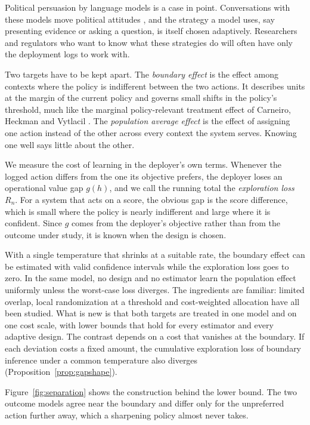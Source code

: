 \documentclass[12pt]{article}
\theoremstyle{definition}
\theoremstyle{remark}
\begin{document}
Political persuasion by language models is a case in point. Conversations with these
models move political attitudes \cite{salvi2025conversational,hackenburg2025levers},
and the strategy a model uses, say presenting evidence or asking a question, is
itself chosen adaptively. Researchers and regulators who want to know what these
strategies do will often have only the deployment logs to work with.

Two targets have to be kept apart. The \emph{boundary effect} is the effect among
contexts where the policy is indifferent between the two actions. It describes units
at the margin of the current policy and governs small shifts in the policy's
threshold, much like the marginal policy-relevant treatment effect of Carneiro,
Heckman and Vytlacil \cite{carneiro2010evaluating}. The \emph{population average
effect} is the effect of assigning one action instead of the other across every
context the system serves. Knowing one well says little about the other.

We measure the cost of learning in the deployer's own terms. Whenever the logged
action differs from the one its objective prefers, the deployer loses an operational
value gap $g(h)$, and we call the running total the \emph{exploration loss} $R_n$.
For a system that acts on a score, the obvious gap is the score difference, which is
small where the policy is nearly indifferent and large where it is confident. Since
$g$ comes from the deployer's objective rather than from the outcome under study, it
is known when the design is chosen.

With a single temperature that shrinks at a suitable rate, the boundary effect can be estimated
with valid confidence intervals while the exploration loss goes to zero. In the same
model, no design and no estimator learn the population effect uniformly unless the
worst-case loss diverges. The ingredients are familiar: limited overlap, local
randomization at a threshold and cost-weighted allocation have all been studied.
What is new is that both targets are treated in one model and on one cost scale,
with lower bounds that hold for every estimator and every adaptive design. The
contrast depends on a cost that vanishes at the boundary. If each deviation costs a
fixed amount, the cumulative exploration loss of boundary inference under a common
temperature also diverges (Proposition~\ref{prop:gapshape}).

Figure~\ref{fig:separation} shows the construction behind the lower bound. The two
outcome models agree near the boundary and differ only for the unpreferred action
further away, which a sharpening policy almost never takes.
\end{document}
